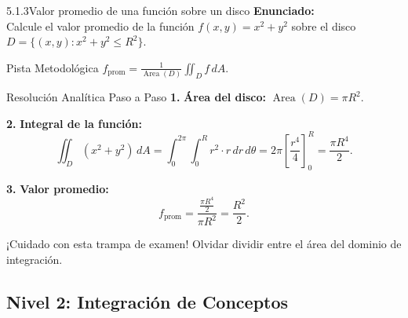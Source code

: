 \documentclass[11pt,a4paper]{article}
\begin{document}
\begin{nivelbox}{5.1.3}{Valor promedio de una función sobre un disco}
\textbf{Enunciado:}\\
Calcule el valor promedio de la función $f(x,y) = x^2 + y^2$ sobre el disco $D = \{ (x,y) : x^2 + y^2 \le R^2 \}$.

\begin{observacionbox}{Pista Metodológica}
$f_{\text{prom}} = \frac{1}{\operatorname{Area}(D)} \iint_D f \, dA$.
\end{observacionbox}

\begin{ejerciciobox}{Resolución Analítica Paso a Paso}
\smallskip\noindent\textbf{1.} \textbf{Área del disco:} $\operatorname{Area}(D) = \pi R^2$.

\smallskip\noindent\textbf{2.} \textbf{Integral de la función:}
\[\iint_D (x^2 + y^2) \, dA = \int_0^{2\pi} \int_0^R r^2 \cdot r \, dr \, d\theta = 2\pi \left[ \frac{r^4}{4} \right]_0^R = \frac{\pi R^4}{2}.\]

\smallskip\noindent\textbf{3.} \textbf{Valor promedio:}
\[f_{\text{prom}} = \frac{\frac{\pi R^4}{2}}{\pi R^2} = \frac{R^2}{2}.\]
\end{ejerciciobox}

\begin{errorbox}{¡Cuidado con esta trampa de examen!}
Olvidar dividir entre el área del dominio de integración.
\end{errorbox}
\end{nivelbox}
\bigskip

\subsection{Nivel 2: Integración de Conceptos}
\end{document}
